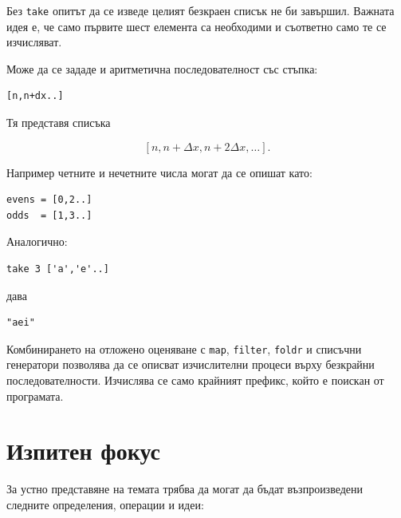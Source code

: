 Без \texttt{take} опитът да се изведе целият безкраен списък не би завършил. Важната идея е, че само първите шест елемента са необходими и съответно само те се изчисляват.

Може да се зададе и аритметична последователност със стъпка:

\begin{verbatim}
[n,n+dx..]
\end{verbatim}

Тя представя списъка

\[
[n,n+\Delta x,n+2\Delta x,\ldots].
\]

Например четните и нечетните числа могат да се опишат като:

\begin{verbatim}
evens = [0,2..]
odds  = [1,3..]
\end{verbatim}

Аналогично:

\begin{verbatim}
take 3 ['a','e'..]
\end{verbatim}

дава

\begin{verbatim}
"aei"
\end{verbatim}

Комбинирането на отложено оценяване с \texttt{map}, \texttt{filter}, \texttt{foldr} и списъчни генератори позволява да се описват изчислителни процеси върху безкрайни последователности. Изчислява се само крайният префикс, който е поискан от програмата.

\section{Изпитен фокус}\label{s:20.7}

За устно представяне на темата трябва да могат да бъдат възпроизведени следните определения, операции и идеи:

